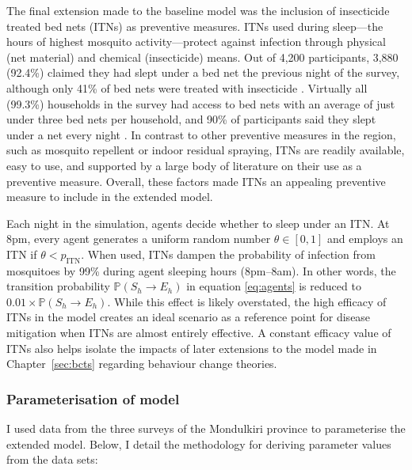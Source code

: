 The final extension made to the baseline model was the inclusion of insecticide treated bed nets (ITNs) as preventive measures. ITNs used during sleep---the hours of highest mosquito activity---protect against infection through physical (net material) and chemical (insecticide) means. Out of 4,200 participants, 3,880 (92.4\%) claimed they had slept under a bed net the previous night of the survey, although only 41\% of bed nets were treated with insecticide \cite{sandfort_forest_2020}. Virtually all (99.3\%) households in the survey had access to bed nets with an average of just under three bed nets per household, and 90\% of participants said they slept under a net every night \cite{sandfort_forest_2020}. In contrast to other preventive measures in the region, such as mosquito repellent or indoor residual spraying, ITNs are readily available, easy to use, and supported by a large body of literature on their use as a preventive measure. Overall, these factors made ITNs an appealing preventive measure to include in the extended model.

Each night in the simulation, agents decide whether to sleep under an ITN. At 8pm, every agent generates a uniform random number $\theta\in[0,1]$ and employs an ITN if $\theta<p_{\text{ITN}}$. When used, ITNs dampen the probability of infection from mosquitoes by 99\% during agent sleeping hours (8pm--8am). In other words, the transition probability $\mathbb{P}(S_h\to E_h)$ in equation \eqref{eq:agents} is reduced to $0.01\times\mathbb{P}(S_h\to E_h)$. While this effect is likely overstated, the high efficacy of ITNs in the model creates an ideal scenario as a reference point for disease mitigation when ITNs are almost entirely effective. A constant efficacy value of ITNs also helps isolate the impacts of later extensions to the model made in Chapter~\ref{sec:bcts} regarding behaviour change theories.

\subsubsection{Parameterisation of model}\label{ch4:parameterisation}

I used data from the three surveys of the Mondulkiri province to parameterise the extended model. Below, I detail the methodology for deriving parameter values from the data sets:

